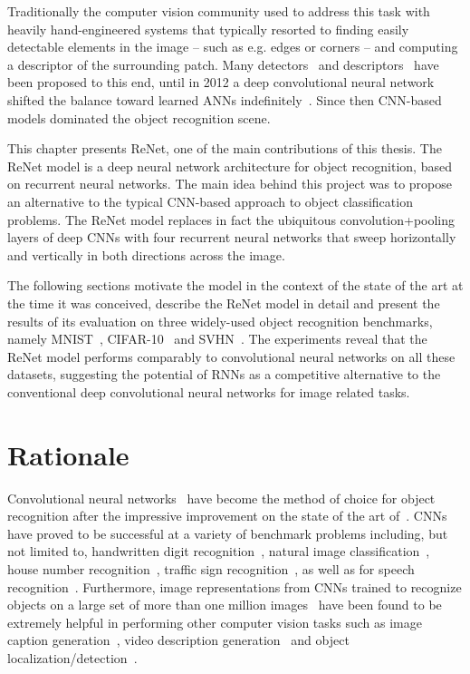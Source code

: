 Traditionally the computer vision community used to address this task with
heavily hand-engineered systems that typically resorted to finding easily
detectable elements in the image -- such as e.g. edges or corners -- and
computing a descriptor of the surrounding patch. Many detectors~\cite{
dufournaud2000matching,harris1988combined,mikolajczyk2001indexing,
lowe2004distinctive,mikolajczyk2005performance} and descriptors~\cite{
lowe1999object,mikolajczyk2005performance,belongie2002shape} have been proposed
to this end, until in 2012 a deep convolutional neural network shifted the
balance toward learned ANNs indefinitely~\citep{Krizhevsky-2012}. Since then
CNN-based models dominated the object recognition scene.

This chapter presents ReNet, one of the main contributions of this thesis.
The ReNet model is a deep neural network architecture for object recognition,
based on recurrent neural networks. The main idea behind this project was to
propose an alternative to the typical CNN-based approach to object
classification problems. The ReNet model replaces in fact the ubiquitous
convolution+pooling layers of deep CNNs with four recurrent neural networks
that sweep horizontally and vertically in both directions across the image.

The following sections motivate the model in the context of the state of the
art at the time it was conceived, describe the ReNet model in detail and
present the results of its evaluation on three widely-used object recognition
benchmarks, namely  MNIST~\citep{Lecun99objectrecognition},
CIFAR-10~\citep{KrizhevskyHinton2009} and SVHN~\citep{Netzer-wkshp-2011}. The
experiments reveal that the ReNet model performs comparably to convolutional
neural networks on all these datasets, suggesting the potential of RNNs as a
competitive alternative to the conventional deep convolutional neural networks
for image related tasks.


\section{Rationale}
Convolutional neural networks~\cite[CNN,][]{Fukushima80,LeCun89} have become the
method of choice for object recognition after the impressive improvement on the
state of the art of~\cite{Krizhevsky-2012}. CNNs have proved to be successful
at a variety of benchmark problems including, but not limited to, handwritten
digit recognition~\citep[see, e.g.,][]{Ciresan-2012}, natural image
classification~\citep[see, e.g.,][]{Lin2014,Simonyan2015,szegedy2014going},
house number recognition~\citep[see, e.g.,][]{Goodfellow+et+al-ICLR2014a},
traffic sign recognition~\citep[see, e.g.,][]{Ciresan-et-al-2012}, as well as
for speech recognition~\citep[see, e.g.,][]{Hamid2012, sainath2013,
toth2014combining}.  Furthermore, image representations from CNNs trained to
recognize objects on a large set of more than one million
images~\citep{Simonyan2015,szegedy2014going} have been found to be extremely
helpful in performing other computer vision tasks such as image caption
generation~\citep[see, e.g.,][]{Vinyals-et-al-arxiv2014,Xu-et-al-arxiv2015},
video description generation~\citep[see, e.g.,][]{Li2015} and object
localization/detection~\citep[see, e.g.,][]{Sermanet14}.


